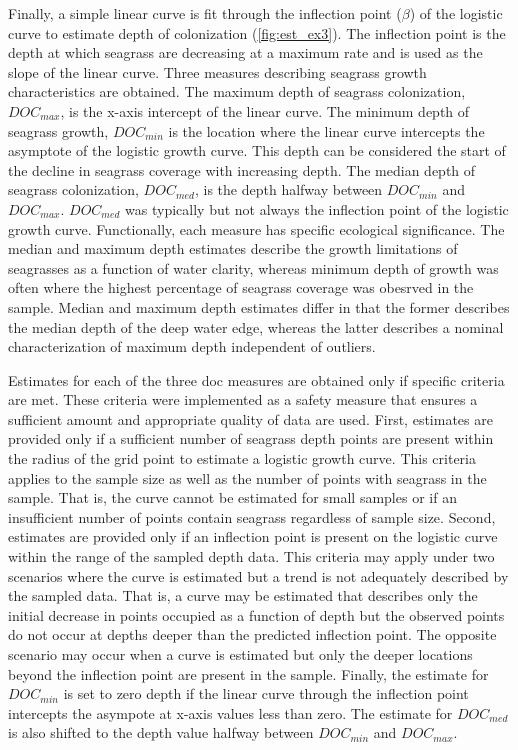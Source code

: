 \documentclass[letterpaper,12pt,oneside]{article}\usepackage[]{graphicx}\usepackage[]{color}
\begin{document}
Finally, a simple linear curve is fit through the inflection point ($\beta$) of the logistic curve to estimate depth of colonization (\cref{fig:est_ex3}).  The inflection point is the depth at which seagrass are decreasing at a maximum rate and is used as the slope of the linear curve.  Three measures describing seagrass growth characteristics are obtained. The maximum depth of seagrass colonization, $DOC_{max}$, is the x-axis intercept of the linear curve.  The minimum depth of seagrass growth, $DOC_{min}$ is the location where the linear curve intercepts the asymptote of the logistic growth curve.  This depth can be considered the start of the decline in seagrass coverage with increasing depth.  The median depth of seagrass colonization, $DOC_{med}$, is the depth halfway between $DOC_{min}$ and $DOC_{max}$.  $DOC_{med}$ was typically but not always the inflection point of the logistic growth curve.  Functionally, each measure has specific ecological significance.  The median and maximum depth estimates describe the growth limitations of seagrasses as a function of water clarity, whereas minimum depth of growth was often where the highest percentage of seagrass coverage was obesrved in the sample.  Median and maximum depth estimates differ in that the former describes the median depth of the deep water edge, whereas the latter describes a nominal characterization of maximum depth independent of outliers.

Estimates for each of the three \ac{doc} measures are obtained only if specific criteria are met.  These criteria were implemented as a safety measure that ensures a sufficient amount and appropriate quality of data are used.  First, estimates are provided only if a sufficient number of seagrass depth points are present within the radius of the grid point to estimate a logistic growth curve.  This criteria applies to the sample size as well as the number of points with seagrass in the sample.  That is, the curve cannot be estimated for small samples or if an insufficient number of points contain seagrass regardless of sample size.  Second, estimates are provided only if an inflection point is present on the logistic curve within the range of the sampled depth data.  This criteria may apply under two scenarios where the curve is estimated but a trend is not adequately described by the sampled data.  That is, a curve may be estimated that describes only the initial decrease in points occupied as a function of depth but the observed points do not occur at depths deeper than the predicted inflection point.  The opposite scenario may occur when a curve is estimated but only the deeper locations beyond the inflection point are present in the sample.  Finally, the estimate for $DOC_{min}$ is set to zero depth if the linear curve through the inflection point intercepts the asympote at x-axis values less than zero.  The estimate for $DOC_{med}$ is also shifted to the depth value halfway between $DOC_{min}$ and $DOC_{max}$.  
\end{document}
